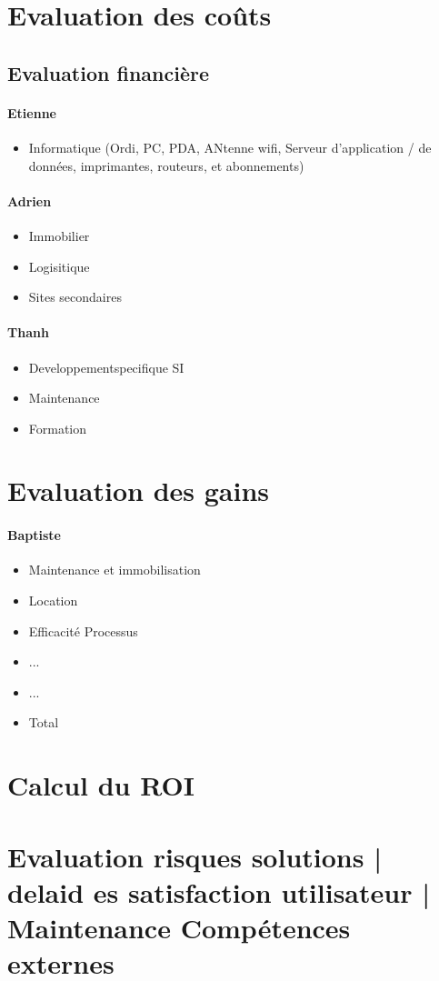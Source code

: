 \section{Evaluation des coûts}

    \subsection{Evaluation financière}
        \paragraph{Etienne}
        \begin{itemize}
            \item Informatique (Ordi, PC, PDA, ANtenne wifi, Serveur d'application / de données, imprimantes, routeurs, et abonnements)
        \end{itemize}
        
        \paragraph{Adrien}
        \begin{itemize}
            \item Immobilier
            \item Logisitique
            \item Sites secondaires
        \end{itemize}
        
        \paragraph{Thanh}
        \begin{itemize}
            \item Developpementspecifique SI
            \item Maintenance
            \item Formation
        \end{itemize}

\section{Evaluation des gains}

    \paragraph{Baptiste}
        \begin{itemize}
            \item Maintenance et immobilisation
            \item Location
            \item Efficacité Processus
            \item ...
            \item ...
            \item Total
        \end{itemize}
        
\section{Calcul du ROI}

\section{Evaluation risques solutions | delaid es satisfaction utilisateur | Maintenance Compétences externes}
